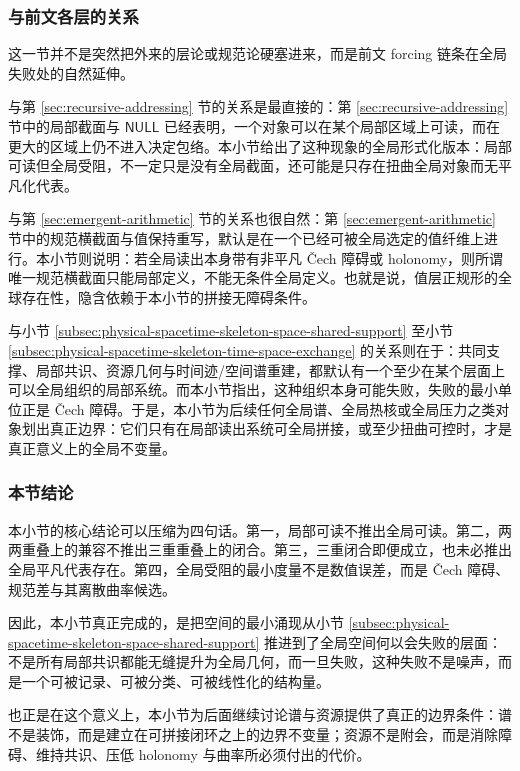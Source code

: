 \subsubsection{与前文各层的关系}

这一节并不是突然把外来的层论或规范论硬塞进来，而是前文 forcing 链条在全局失败处的自然延伸。

与第 \ref{sec:recursive-addressing} 节的关系是最直接的：第 \ref{sec:recursive-addressing} 节中的局部截面与 \(\mathsf{NULL}\) 已经表明，一个对象可以在某个局部区域上可读，而在更大的区域上仍不进入决定包络。本小节给出了这种现象的全局形式化版本：局部可读但全局受阻，不一定只是没有全局截面，还可能是只存在扭曲全局对象而无平凡化代表。

与第 \ref{sec:emergent-arithmetic} 节的关系也很自然：第 \ref{sec:emergent-arithmetic} 节中的规范横截面与值保持重写，默认是在一个已经可被全局选定的值纤维上进行。本小节则说明：若全局读出本身带有非平凡 Čech 障碍或 holonomy，则所谓唯一规范横截面只能局部定义，不能无条件全局定义。也就是说，值层正规形的全球存在性，隐含依赖于本小节的拼接无障碍条件。

与小节 \ref{subsec:physical-spacetime-skeleton-space-shared-support} 至小节 \ref{subsec:physical-spacetime-skeleton-time-space-exchange} 的关系则在于：共同支撑、局部共识、资源几何与时间迹/空间谱重建，都默认有一个至少在某个层面上可以全局组织的局部系统。而本小节指出，这种组织本身可能失败，失败的最小单位正是 Čech 障碍。于是，本小节为后续任何全局谱、全局热核或全局压力之类对象划出真正边界：它们只有在局部读出系统可全局拼接，或至少扭曲可控时，才是真正意义上的全局不变量。

\subsubsection{本节结论}

本小节的核心结论可以压缩为四句话。第一，局部可读不推出全局可读。第二，两两重叠上的兼容不推出三重重叠上的闭合。第三，三重闭合即便成立，也未必推出全局平凡代表存在。第四，全局受阻的最小度量不是数值误差，而是 Čech 障碍、规范差与其离散曲率候选。

因此，本小节真正完成的，是把空间的最小涌现从小节 \ref{subsec:physical-spacetime-skeleton-space-shared-support} 推进到了全局空间何以会失败的层面：不是所有局部共识都能无缝提升为全局几何，而一旦失败，这种失败不是噪声，而是一个可被记录、可被分类、可被线性化的结构量。

也正是在这个意义上，本小节为后面继续讨论谱与资源提供了真正的边界条件：谱不是装饰，而是建立在可拼接闭环之上的边界不变量；资源不是附会，而是消除障碍、维持共识、压低 holonomy 与曲率所必须付出的代价。
